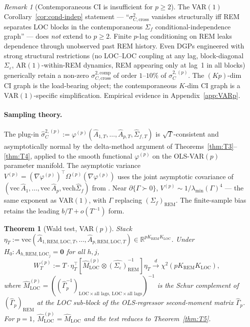 \documentclass[11pt,letterpaper]{article}
\newtheorem{theorem}{Theorem}
\theoremstyle{remark}
\newtheorem{remark}{Remark}
\newcommand{\REM}{\mathrm{REM}}
\newcommand{\LOC}{\mathrm{LOC}}
\newcommand{\Sigmaf}{\Sigma_f}
\newcommand{\Sigmae}{\Sigma_\varepsilon}
\newcommand{\Mloc}{M_{\LOC}}
\newcommand{\vech}{\mathrm{vech}}
\begin{document}
\begin{remark}[Contemporaneous CI is insufficient for $p \ge 2$]\label{rem:contemp-CI-fail}
The VAR$(1)$ Corollary~\ref{cor:cond-indep} statement --- ``$\sigma^2_{C, \mathrm{cross}}$ vanishes structurally iff REM separates LOC blocks in the contemporaneous $\Sigmaf$ conditional-independence graph'' --- does \emph{not} extend to $p \ge 2$. Finite $p$-lag conditioning on REM leaks dependence through unobserved past REM history. Even DGPs engineered with strong structural restrictions (no LOC--LOC coupling at any lag, block-diagonal $\Sigmae$, AR$(1)$-within-REM dynamics, REM appearing only at lag~1 in all blocks) generically retain a non-zero $\sigma^{2,\text{comp}}_{C, \mathrm{cross}}$ of order $1$--$10\%$ of $\sigma^{2,(p)}_C$. The $(Kp)$-dim CI graph is the load-bearing object; the contemporaneous $K$-dim CI graph is a VAR$(1)$-specific simplification. Empirical evidence in Appendix~\ref{app:VARp}.
\end{remark}

\paragraph{Sampling theory.} The plug-in $\widehat\sigma^{2,(p)}_C := \varphi^{(p)}(\widehat A_{1,T}, \ldots, \widehat A_{p,T}, \widehat\Sigmaf{}_{,T})$ is $\sqrt{T}$-consistent and asymptotically normal by the delta-method argument of Theorems~\ref{thm:T3}--\ref{thm:T4}, applied to the smooth functional $\varphi^{(p)}$ on the OLS-VAR$(p)$ parameter manifold. The asymptotic variance $V^{(p)} = (\nabla\varphi^{(p)})^\top \Omega^{(p)} (\nabla\varphi^{(p)})$ uses the joint asymptotic covariance of $(\mathrm{vec}\,\widehat A_1, \ldots, \mathrm{vec}\,\widehat A_p, \vech\widehat\Sigmaf)$ from \cite[Prop.~3.2, Ch.~3.4]{Lutkepohl2005}. Near $\partial\{\Gamma \succ 0\}$, $V^{(p)} \sim 1/\lambda_{\min}(\Gamma)^4$ --- the same exponent as VAR$(1)$, with $\Gamma$ replacing $(\Sigmaf)_\REM$. The finite-sample bias retains the leading $b/T + o(T^{-1})$ form.

\begin{theorem}[Wald test, VAR$(p)$]\label{thm:T5p}
Stack $\eta_T := \mathrm{vec}(\widehat A_{1, \REM, \LOC, T}, \ldots, \widehat A_{p, \REM, \LOC, T}) \in \mathbb{R}^{p K_\REM K_\LOC}$. Under $H_0: A_{h, \REM, \LOC_j} = \mathbf{0}$ for all $h, j$,
\begin{equation}\label{eq:T5p}
W_T^{(p)} := T \cdot \eta_T^\top \!\left[\widehat M_\LOC^{(p)} \otimes \widehat{(\Sigmae)}_\REM^{-1}\right] \eta_T \xrightarrow{d} \chi^2(p K_\REM K_\LOC),
\end{equation}
where $\widehat M_\LOC^{(p)} = ((\widehat\Gamma_p^{-1})_{\LOC \times \text{all lags},\, \LOC \times \text{all lags}})^{-1}$ is the Schur complement of $(\widehat\Gamma_p)_\REM$ at the LOC sub-block of the OLS-regressor second-moment matrix $\widehat\Gamma_p$. For $p = 1$, $\widehat M_\LOC^{(p)} = \widehat\Mloc$ and the test reduces to Theorem~\ref{thm:T5}.
\end{theorem}
\end{document}
